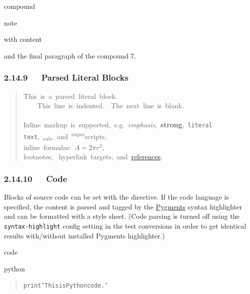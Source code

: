 \documentclass[a4paper]{article}
\begin{document}
\begin{DUclass}{compound}
\begin{DUclass}{note}
\begin{DUadmonition}
with content
\end{DUadmonition}
\end{DUclass}
and the final paragraph of the compound 7.
\end{DUclass}


\subsubsection{2.14.9   Parsed Literal Blocks%
  \label{parsed-literal-blocks}%
}

\begin{quote}
\ttfamily\raggedright
This~is~a~parsed~literal~block.\\
~~~~This~line~is~indented.~~The~next~line~is~blank.\\
~\\
Inline~markup~is~supported,~e.g.~\emph{emphasis},~\textbf{strong},~\texttt{literal\\
text},~\textsubscript{sub-}~and~\textsuperscript{super}scripts,\\
inline~formulas:~$A = 2 \pi r^2$,\\
footnotes,~%
\label{hyperlink-targets}hyperlink~targets,~and~\href{http://www.python.org/}{references}.
\end{quote}


\subsubsection{2.14.10   Code%
  \label{code}%
}

Blocks of source code can be set with the  directive. If the code
language is specified, the content is parsed and tagged by the \href{http://pygments.org/}{Pygments}
syntax highlighter and can be formatted with a style sheet. (Code parsing
is turned off using the \texttt{syntax-highlight} config setting in the test
conversions in order to get identical results with/without installed
Pygments highlighter.)

\begin{DUclass}{code}
\begin{DUclass}{python}
\begin{quote}
\begin{alltt}
print 'This is Python code.'
\end{alltt}
\end{quote}
\end{DUclass}
\end{DUclass}
\end{document}
